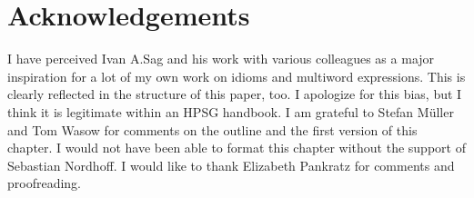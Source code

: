 \documentclass[output=paper
                ,modfonts
                ,nonflat
	        ,collection
	        ,collectionchapter
	        ,collectiontoclongg
 	        ,biblatex
                ,babelshorthands
                ,newtxmath
                ,draftmode
                ,colorlinks, citecolor=brown
]{./langsci/langscibook}
\begin{document}
\section*{Acknowledgements}

I have perceived Ivan A.\@ Sag and his work with various colleagues as a major inspiration for a lot of my own work on idioms and multiword expressions. 
This is clearly reflected in the structure of this paper, too. 
I apologize for this bias, but I think it is legitimate within an HPSG handbook.
%
I am grateful to Stefan Müller and Tom Wasow for comments on the outline and the first version of this chapter. 
%
I would not have been able to format this chapter without the support of Sebastian Nordhoff.
%
I would like to thank Elizabeth Pankratz for comments and proofreading.

{\sloppy
\printbibliography[heading=subbibliography,notkeyword=this] }
\end{document}

